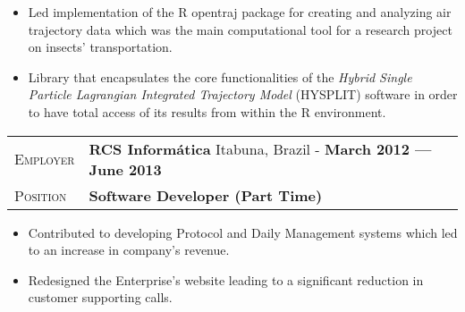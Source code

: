 \documentclass[10pt, a4paper, oneside, final]{scrartcl} %
\newcommand{\gray}{\rowcolor[gray]{.90}} %
\begin{document}
\begin{itemize}\itemsep1.0pt

\item Led implementation of the R opentraj package for creating and analyzing air trajectory data which was the main computational tool for a research project on insects' transportation.

\item Library that encapsulates the core functionalities of the \textit{Hybrid Single Particle Lagrangian Integrated Trajectory Model} (HYSPLIT) software in order to have total access of its results from within the R environment.

\end{itemize}

\begin{center}
\begin{tabularx}{1.0\linewidth}{>{\raggedleft\scshape}p{2.2cm}X}
\gray Employer & \textbf{RCS Informática} \hfill Itabuna, Brazil - \textbf{March 2012 --- June 2013}\\
\gray Position & \textbf{Software Developer (Part Time)}\\
\end{tabularx}
\end{center}

\begin{itemize}\itemsep1.0pt
\item Contributed to developing Protocol and Daily Management systems which led to an increase in company's revenue.

\item Redesigned the Enterprise's website leading to a significant reduction in customer supporting calls.



\end{itemize}

\end{document}
